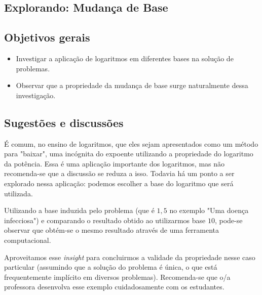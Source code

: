 \cleardoublepage

\def\currentcolor{session1}
\begin{texto}
{
\section{Explorando: Mudança de Base}
\subsection{Objetivos gerais}
\begin{itemize}
\item Investigar a aplicação de logaritmos em diferentes bases na solução de problemas.
\item Observar que a propriedade da mudança de base surge naturalmente dessa investigação.
\end{itemize}
\subsection{Sugestões e discussões}
É comum, no ensino de logaritmos, que eles sejam apresentados como um método para "baixar", uma incógnita do expoente utilizando a propriedade do logaritmo da potência. Essa é uma aplicação importante dos logaritmos, mas não recomenda-se que a discussão se reduza a isso. Todavia há um ponto a ser explorado nessa aplicação: podemos escolher a base do logaritmo que será utilizada.

Utilizando a base induzida pelo problema (que é $1{,}5$ no exemplo "Uma doença infecciosa") e comparando o resultado obtido ao utilizarmos base $10$, pode-se observar que obtém-se o mesmo resultado através de uma ferramenta computacional.

Aproveitamos esse \textit{insight} para concluirmos a validade da propriedade nesse caso particular (assumindo que a solução do problema é única, o que está frequentemente implícito em diversos problemas). Recomenda-se que o/a professora desenvolva esse exemplo cuidadosamente com os estudantes.
}
\end{texto}

